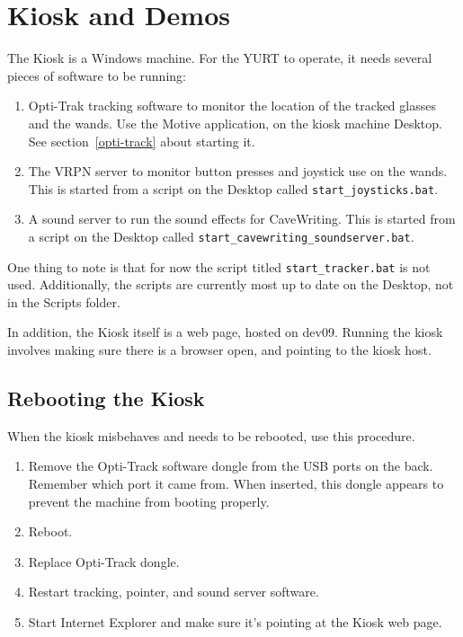 \documentclass[11pt]{article}
\newcommand{\yurt}{YURT\xspace}
\newcommand{\cmd}[1]{\texttt{#1}\xspace}
\begin{document}
\section{Kiosk and Demos}

The Kiosk is a Windows machine.  For the \yurt to operate, it needs
several pieces of software to be running:

\begin{enumerate}
\item Opti-Trak tracking software to monitor the location of the
  tracked glasses and the wands.  Use the Motive application, on the
  kiosk machine Desktop.  See section~\ref{opti-track} about starting
  it.

\item The VRPN server to monitor button presses and joystick use on
  the wands.  This is started from a script on the Desktop called \cmd{start\_joysticks.bat}.

\item A sound server to run the sound effects for CaveWriting.  This
  is started from a script on the Desktop called \cmd{start\_cavewriting\_soundserver.bat}.

\end{enumerate}


One thing to note is that for now the script titled \cmd{start\_tracker.bat} is not used. Additionally, the scripts are currently most up to date on the Desktop, not in the Scripts folder.

In addition, the Kiosk itself is a web page, hosted on dev09.  Running
the kiosk involves making sure there is a browser open, and pointing
to the kiosk host.


\subsection{Rebooting the Kiosk}

When the kiosk misbehaves and needs to be rebooted, use this
procedure.

\begin{enumerate}
\item Remove the Opti-Track software dongle from the USB ports on the
  back.  Remember which port it came from.  When inserted, this dongle
  appears to prevent the machine from booting properly.

\item Reboot.

\item Replace Opti-Track dongle.

\item Restart tracking, pointer, and sound server software.

\item Start Internet Explorer and make sure it's pointing at the Kiosk
  web page.

\end{enumerate}
\end{document}
